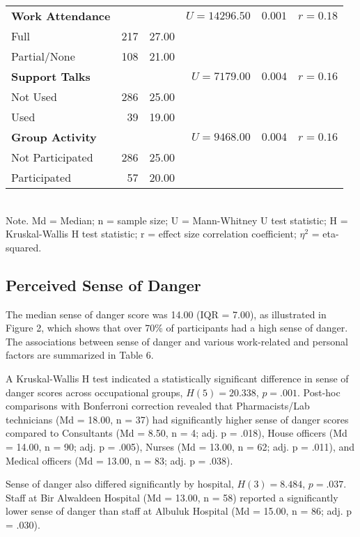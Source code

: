 \documentclass[12pt]{article}
\begin{document}
\begin{table}[h!]
\begin{tabular}{l r r r r r}
\midrule
\textbf{Work Attendance} & & & $U = 14296.50$ & $0.001$ & $r = 0.18$ \\
\quad Full & 217 & 27.00 & & & \\
\quad Partial/None & 108 & 21.00 & & & \\
\midrule
\textbf{Support Talks} & & & $U = 7179.00$ & $0.004$ & $r = 0.16$ \\
\quad Not Used & 286 & 25.00 & & & \\
\quad Used & 39 & 19.00 & & & \\
\midrule
\textbf{Group Activity} & & & $U = 9468.00$ & $0.004$ & $r = 0.16$ \\
\quad Not Participated & 286 & 25.00 & & & \\
\quad Participated & 57 & 20.00 & & & \\
\bottomrule
\end{tabular}
\\
\smallskip
\footnotesize Note. Md = Median; n = sample size; U = Mann-Whitney U test statistic; H = Kruskal-Wallis H test statistic; r = effect size correlation coefficient; $\eta^2$ = eta-squared.
\end{table}

\subsection{Perceived Sense of Danger}
The median sense of danger score was 14.00 (IQR = 7.00), as illustrated in Figure 2, which shows that over 70\% of participants had a high sense of danger. The associations between sense of danger and various work-related and personal factors are summarized in Table 6.

A Kruskal-Wallis H test indicated a statistically significant difference in sense of danger scores across occupational groups, $H(5) = 20.338$, $p = .001$. Post-hoc comparisons with Bonferroni correction revealed that Pharmacists/Lab technicians (Md = 18.00, n = 37) had significantly higher sense of danger scores compared to Consultants (Md = 8.50, n = 4; adj. p = .018), House officers (Md = 14.00, n = 90; adj. p = .005), Nurses (Md = 13.00, n = 62; adj. p = .011), and Medical officers (Md = 13.00, n = 83; adj. p = .038).

Sense of danger also differed significantly by hospital, $H(3) = 8.484$, $p = .037$. Staff at Bir Alwaldeen Hospital (Md = 13.00, n = 58) reported a significantly lower sense of danger than staff at Albuluk Hospital (Md = 15.00, n = 86; adj. p = .030).
\end{document}
